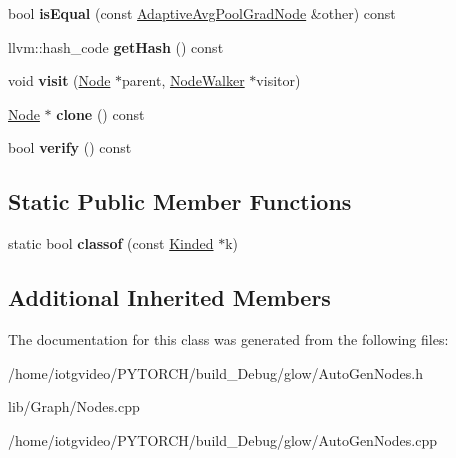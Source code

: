 \begin{DoxyCompactItemize}
bool {\bfseries is\+Equal} (const \hyperlink{classglow_1_1_adaptive_avg_pool_grad_node}{Adaptive\+Avg\+Pool\+Grad\+Node} \&other) const
\item 
\mbox{\label{classglow_1_1_adaptive_avg_pool_grad_node_aa77596d9fbdcb390b18379171847343e}} 
llvm\+::hash\+\_\+code {\bfseries get\+Hash} () const
\item 
\mbox{\label{classglow_1_1_adaptive_avg_pool_grad_node_ad66466bae07c35e544362217d318acd7}} 
void {\bfseries visit} (\hyperlink{classglow_1_1_node}{Node} $\ast$parent, \hyperlink{classglow_1_1_node_walker}{Node\+Walker} $\ast$visitor)
\item 
\mbox{\label{classglow_1_1_adaptive_avg_pool_grad_node_a8abc1b0a3f391e1d6c297f671def5506}} 
\hyperlink{classglow_1_1_node}{Node} $\ast$ {\bfseries clone} () const
\item 
\mbox{\label{classglow_1_1_adaptive_avg_pool_grad_node_abbde5cc87b7f1904fbb549c4aa376b6c}} 
bool {\bfseries verify} () const
\end{DoxyCompactItemize}
\subsection*{Static Public Member Functions}
\begin{DoxyCompactItemize}
\item 
\mbox{\label{classglow_1_1_adaptive_avg_pool_grad_node_a03d43375a9d7f2a7f12e5fe9d55f289d}} 
static bool {\bfseries classof} (const \hyperlink{classglow_1_1_kinded}{Kinded} $\ast$k)
\end{DoxyCompactItemize}
\subsection*{Additional Inherited Members}


The documentation for this class was generated from the following files\+:\begin{DoxyCompactItemize}
\item 
/home/iotgvideo/\+P\+Y\+T\+O\+R\+C\+H/build\+\_\+\+Debug/glow/Auto\+Gen\+Nodes.\+h\item 
lib/\+Graph/Nodes.\+cpp\item 
/home/iotgvideo/\+P\+Y\+T\+O\+R\+C\+H/build\+\_\+\+Debug/glow/Auto\+Gen\+Nodes.\+cpp\end{DoxyCompactItemize}
